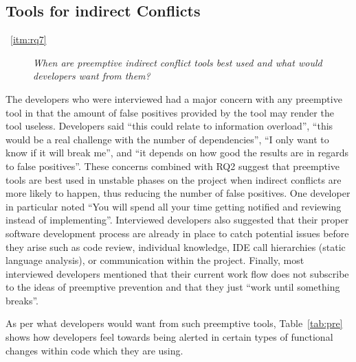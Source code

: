 \documentclass[conference]{IEEEtran}
\begin{document}
\subsection{Tools for indirect Conflicts}

\begin{description}
	\item[~\ref{itm:rq7}] \textit{When are preemptive indirect conflict tools best used and what would developers want from them?}
\end{description}

The developers who were interviewed had a major concern with any preemptive tool in that the amount of false positives
provided by the tool may render the tool useless. Developers said ``this could relate to information overload'', ``this would
be a real challenge with the number of dependencies'', ``I only want to know if it will break me'', and ``it depends on how
good the results are in regards to false positives''. These concerns combined with RQ2 suggest that preemptive tools are
best used in unstable phases on the project when indirect conflicts are more likely to happen, thus reducing the number of false
positives. One developer in particular noted ``You will spend all your time getting notified and reviewing instead of implementing''.
Interviewed developers also suggested that their proper software development process are already in place to
catch potential issues before they arise such as code review, individual knowledge, IDE call hierarchies (static language analysis),
or communication within the project. Finally, most interviewed developers mentioned that their current work flow does
not subscribe to the ideas of preemptive prevention and that they just ``work until something breaks''. 

As per what developers would want from such preemptive tools, Table~\ref{tab:pre} shows how developers feel towards being 
alerted in certain types of functional changes within code which they are using.
\end{document}
